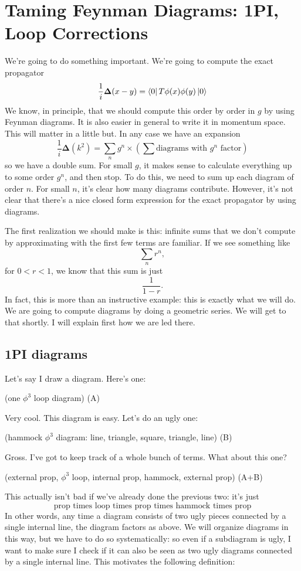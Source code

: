 \documentclass[main.tex]{subfiles}
\begin{document}
\chapter{Taming Feynman Diagrams: 1PI, Loop Corrections}
We're going to do something important. We're going to compute the exact propagator 
\[
\frac{1}{i}\mathbf{\Delta}(x-y) = \bra{0} T \phi(x) \phi(y) \ket{0}
\]
We know, in principle, that we should compute this order by order in $g$ by using Feynman diagrams. It is also easier in general to write it in momentum space. This will matter in a little but. In any case we have an expansion
\[
\frac{1}{i}\mathbf{\Delta}(k^2) = \sum_n g^n \times \left( \sum \text{diagrams with $g^n$ factor} \right)
\]
so we have a double sum. For small $g$, it makes sense to calculate everything up to some order $g^n$, and then stop. To do this, we need to sum up each diagram of order $n$. For small $n$, it's clear how many diagrams contribute. However, it's not clear that there's a nice closed form expression for the exact propagator by using diagrams.

The first realization we should make is this: infinite sums that we don't compute by approximating with the first few terms are familiar. If we see something like
\[
\sum_n r^n,
\]
for $0 < r < 1$, we know that this sum is just
\[
\frac{1}{1-r}.
\]
In fact, this is more than an instructive example: this is exactly what we will do. We are going to compute diagrams by doing a geometric series. We will get to that shortly. I will explain first how we are led there. \newpage

\section{1PI diagrams}
Let's say I draw a diagram. Here's one:

(one $\phi^3$ loop diagram) (A)

Very cool. This diagram is easy. Let's do an ugly one:

(hammock $\phi^3$ diagram: line, triangle, square, triangle, line) (B)

Gross. I've got to keep track of a whole bunch of terms. What about this one?

(external prop, $\phi^3$ loop, internal prop, hammock, external prop) (A+B)

This actually isn't bad if we've already done the previous two: it's just
\[
\text{prop times loop times prop times hammock times prop}
\]
In other words, any time a diagram consists of two ugly pieces connected by a single internal line, the diagram factors as above. We will organize diagrams in this way, but we have to do so systematically: so even if a subdiagram is ugly, I want to make sure I check if it can also be seen as two ugly diagrams connected by a single internal line. This motivates the following definition:
\end{document}
